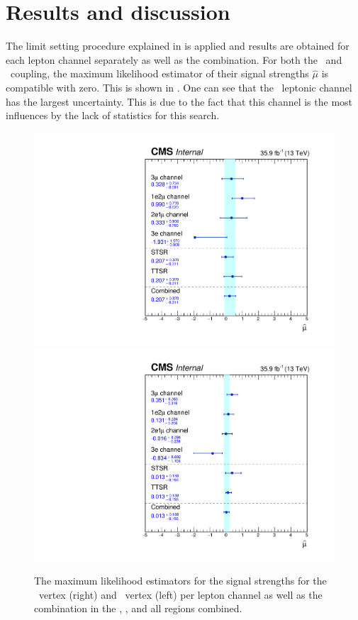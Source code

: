 \newpage
\section{Results and discussion}
The limit setting procedure explained in  is applied and results are obtained for each lepton channel separately as well as the combination. For both the \Zut\ and \Zct\ coupling, the maximum likelihood estimator of their signal strengths $\hat{\mu}$ is compatible with zero. This is shown in . One can see that the \eee\ leptonic channel has the largest uncertainty. This is due to the fact that this channel is the most influences by the lack of statistics for this search.
\begin{figure}[htbp]
	\centering
	\includegraphics[width=0.49\linewidth]{6_Search/Figures/MLE/MLEZut.pdf}
	\includegraphics[width=0.49\linewidth]{6_Search/Figures/MLE/MLEZct.pdf}
	\caption{The maximum likelihood estimators for the signal strengths for the \Zut\ vertex (right) and \Zct\ vertex (left) per lepton channel as well as the combination in the \STSR, \TTSR, and all regions combined. }
	\label{fig:mlezut}
\end{figure}

